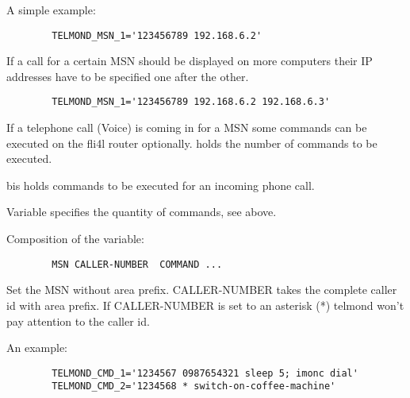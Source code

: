 \begin{description}
  
  A simple example:

\begin{example}
\begin{verbatim}
        TELMOND_MSN_1='123456789 192.168.6.2'            
\end{verbatim}
\end{example}

  If a call for a certain MSN should be displayed on more computers 
  their IP addresses have to be specified one after the other.

\begin{example}
\begin{verbatim}
        TELMOND_MSN_1='123456789 192.168.6.2 192.168.6.3'            
\end{verbatim}
\end{example}

  
  If a telephone call (Voice) is coming in for a MSN some commands can be 
  executed on the fli4l router optionally.  holds 
  the number of commands to be executed.

  
   bis  holds commands to be 
  executed for an incoming phone call.
  
  Variable  specifies the quantity of commands,
  see above.
  
  Composition of the variable:

\begin{example}
\begin{verbatim}
        MSN CALLER-NUMBER  COMMAND ...
\end{verbatim}
\end{example}
  
  Set the MSN without area prefix. CALLER-NUMBER takes the complete caller id 
  with area prefix. If CALLER-NUMBER is set to an asterisk (*) telmond won't 
  pay attention to the caller id.
  
  An example:

\begin{example}
\begin{verbatim}
        TELMOND_CMD_1='1234567 0987654321 sleep 5; imonc dial'
        TELMOND_CMD_2='1234568 * switch-on-coffee-machine'
\end{verbatim}
\end{example}
  

\end{description}
